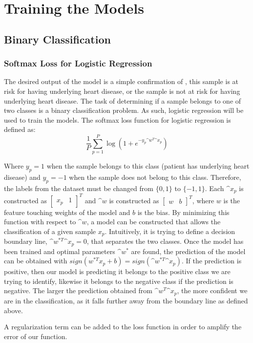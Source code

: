 \documentclass[12pt,conference]{IEEEtran}
\begin{document}
\section{Training the Models}
\subsection {Binary Classification}
\subsubsection{Softmax Loss for Logistic Regression}
The desired output of the model is a simple confirmation of , this sample is at risk for having underlying heart disease, or  the sample is not at risk for having underlying heart disease. The task of determining if a sample belongs to one of two classes is a binary classification problem. As such, logistic regression will be used to train the models. The softmax loss function for logistic regression is defined as:
$$\frac{1}{P}\sum_{p=1}^{P} \log\left(1+e^{-y_p\^w^T\^x_p}\right) $$

Where $y_p = 1$ when the sample belongs to this class (patient has underlying heart disease) and $y_p = -1$ when the sample does not belong to this class. Therefore, the labels from the dataset must be changed from $\{0,1\}$ to $\{-1,1\}$. Each $\^x_p$ is constructed as $\begin{bmatrix}x_p&1\end{bmatrix}^T$ and $\^w$ is constructed as $\begin{bmatrix}w&b\end{bmatrix}^T$, where $w$ is the feature touching weights of the model and $b$ is the bias. By minimizing this function with respect to $\^w$, a model can be constructed that allows the classification of a given sample $x_p$. Intuitively, it is trying to define a decision boundary line, $\^w^{*T}\^x_p = 0$, that separates the two classes.  Once the model has been trained and optimal parameters $\^w^*$ are found, the prediction of the model can be obtained with $sign(w^{*T}x_p + b) = sign(\^w^{*T}\^x_p)$. If the prediction is positive, then our model is predicting it belongs to the positive class we are trying to identify, likewise it belongs to the negative class if the prediction is negative. The larger the prediction obtained from $\^w^T\^x_p$, the more confident we are in the classification, as it falls further away from the boundary line as defined above.

A regularization term can be added to the loss function in order to amplify the error of our function.
\end{document}
